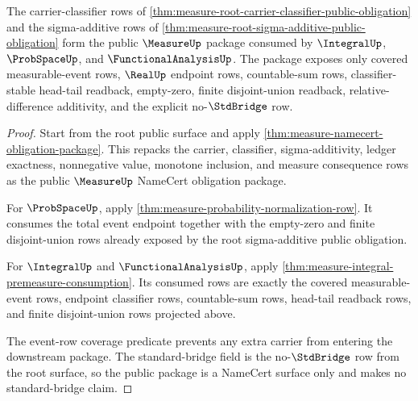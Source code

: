 \begin{theorem}
\label{thm:measure-root-downstream-unblock-package}
The carrier-classifier rows of
\autoref{thm:measure-root-carrier-classifier-public-obligation} and the
sigma-additive rows of
\autoref{thm:measure-root-sigma-additive-public-obligation} form the public
$\MeasureUp$ package consumed by $\IntegralUp$, $\ProbSpaceUp$, and
$\FunctionalAnalysisUp$. The package exposes only covered measurable-event
rows, $\RealUp$ endpoint rows, countable-sum rows, classifier-stable
head-tail readback, empty-zero, finite disjoint-union readback,
relative-difference additivity, and the explicit no-$\StdBridge$ row.
\end{theorem}
\begin{proof}
Start from the root public surface and apply
\autoref{thm:measure-namecert-obligation-package}. This repacks the carrier,
classifier, sigma-additivity, ledger exactness, nonnegative value, monotone
inclusion, and measure consequence rows as the public $\MeasureUp$ NameCert
obligation package.

For $\ProbSpaceUp$, apply
\autoref{thm:measure-probability-normalization-row}. It consumes the total
event endpoint together with the empty-zero and finite disjoint-union rows
already exposed by the root sigma-additive public obligation.

For $\IntegralUp$ and $\FunctionalAnalysisUp$, apply
\autoref{thm:measure-integral-premeasure-consumption}. Its consumed rows are
exactly the covered measurable-event rows, endpoint classifier rows,
countable-sum rows, head-tail readback rows, and finite disjoint-union rows
projected above.

The event-row coverage predicate prevents any extra carrier from entering the
downstream package. The standard-bridge field is the no-$\StdBridge$ row from
the root surface, so the public package is a NameCert surface only and makes
no standard-bridge claim.
\end{proof}
